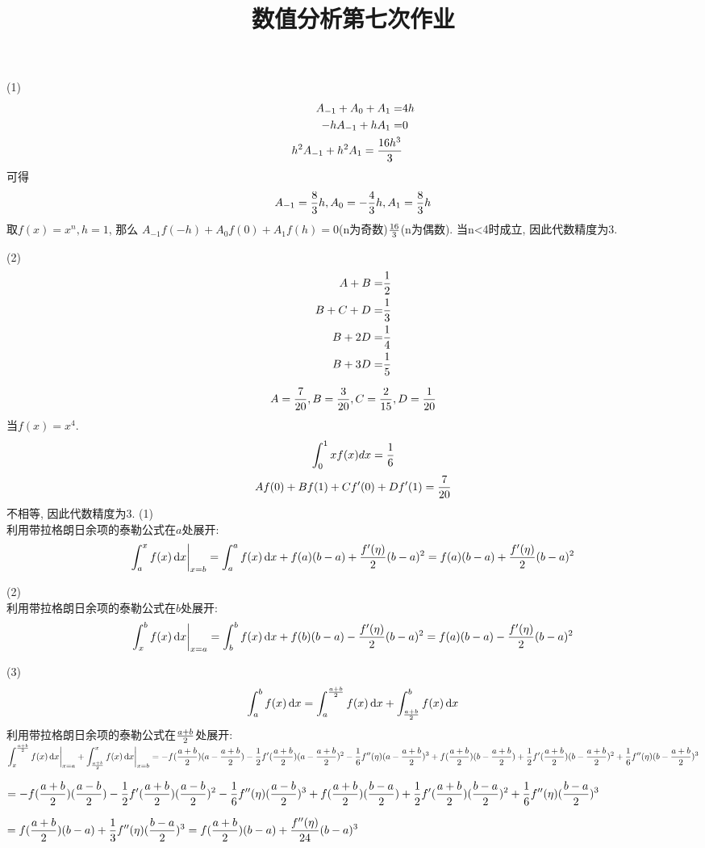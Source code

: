 \documentclass[UTF8,9pt]{ctexart}
\title{数值分析第七次作业}
\begin{document}
 
\maketitle
{}
(1)\\
$$\begin{aligned} 
        A_{-1}+A_0+A_1=&4h\\
        -hA_{-1}+hA_1=&0\\
        h^2A_{-1}+h^2A_1=\frac{16h^3}{3}
 \end{aligned}$$
可得
$$A_{-1}=\frac{8}{3}h ,A_0=-\frac{4}{3}h, A_1=\frac{8}{3}h$$
取$f(x)=x^n,h=1$, 那么 $A_{-1} f(-h)+A_{0} f(0)+A_{1} f(h) = 0$(n为奇数)$\frac{16}{3}$(n为偶数). 当n<4时成立, 因此代数精度为3. 

(2)\\
$$\begin{aligned} 
        A+B=&\frac{1}{2}\\
        B+C+D=&\frac{1}{3}\\
        B+2D =& \frac{1}{4}\\
        B+3D =& \frac{1}{5}
 \end{aligned}$$

$$A=\frac{7}{20},B=\frac{3}{20},C=\frac{2}{15},D=\frac{1}{20}$$
当$f(x)=x^4$. $$ 
\int_{0}^{1} x f(x) d x = \frac{1}{6}
 $$
 $$ 
A f(0)+B f(1)+C f^{\prime}(0)+D f^{\prime}(1) = \frac{7}{20}
 $$
不相等, 因此代数精度为3.
(1)\\
利用带拉格朗日余项的泰勒公式在$a$处展开:
$$\int_a^x f(x)\mathop{}\!\mathrm{d} x\bigg|_{x=b}=\int_a^af(x)\mathop{}\!\mathrm{d} x+f(a)(b-a)+\frac{f'(\eta)}{2}(b-a)^2=f(a)(b-a)+\frac{f'(\eta)}{2}(b-a)^2$$

(2)\\
利用带拉格朗日余项的泰勒公式在$b$处展开:
$$\int_x^b f(x)\mathop{}\!\mathrm{d} x\bigg|_{x=a}=\int_b^bf(x)\mathop{}\!\mathrm{d} x+f(b)(b-a)-\frac{f'(\eta)}{2}(b-a)^2=f(a)(b-a)-\frac{f'(\eta)}{2}(b-a)^2$$

(3)\\
$$ 
\int_{a}^{b} f(x) \mathop{}\!\mathrm{d} x =\int_{a}^{\frac{a+b}{2}} f(x) \mathop{}\!\mathrm{d} x +\int_{\frac{a+b}{2}}^{b} f(x) \mathop{}\!\mathrm{d} x 
 $$
 利用带拉格朗日余项的泰勒公式在$\frac{a+b}{2}$处展开:\\
$\displaystyle\int_{x}^{\frac{a+b}{2}} f(x) \mathop{}\!\mathrm{d} x \bigg|_{x=a}+\int_{\frac{a+b}{2}}^{x} f(x) \mathop{}\!\mathrm{d} x \bigg|_{x=b}=-f(\frac{a+b}{2})(a-\frac{a+b}{2})-\frac{1}{2}f'(\frac{a+b}{2})(a-\frac{a+b}{2})^2-\frac{1}{6}f''(\eta)(a-\frac{a+b}{2})^3+f(\frac{a+b}{2})(b-\frac{a+b}{2})+\frac{1}{2}f'(\frac{a+b}{2})(b-\frac{a+b}{2})^2+\frac{1}{6}f''(\eta)(b-\frac{a+b}{2})^3$


$\displaystyle=-f(\frac{a+b}{2})(\frac{a-b}{2})-\frac{1}{2}f'(\frac{a+b}{2})(\frac{a-b}{2})^2-\frac{1}{6}f''(\eta)(\frac{a-b}{2})^3+f(\frac{a+b}{2})(\frac{b-a}{2})+\frac{1}{2}f'(\frac{a+b}{2})(\frac{b-a}{2})^2+\frac{1}{6}f''(\eta)(\frac{b-a}{2})^3$

$\displaystyle =f(\frac{a+b}{2})(b-a)+\frac{1}{3}f''(\eta)(\frac{b-a}{2})^3=f(\frac{a+b}{2})(b-a)+\frac{f''(\eta)}{24}(b-a)^{3}$
\end{document}

